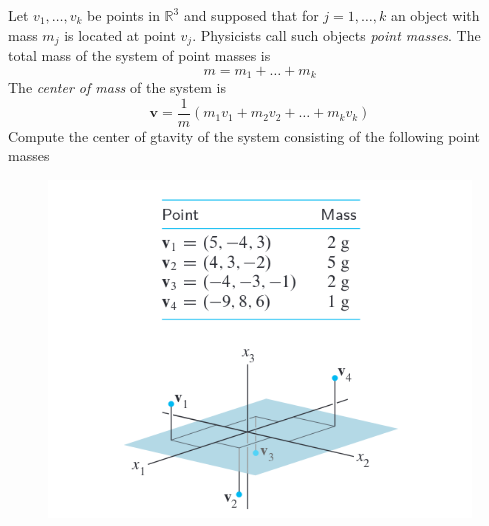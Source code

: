 \documentclass{mathhomework}
\newcommand{\R}{\mathbb{R}}  %
\newcommand{\Vect}[1]{\pmb{#1}}
\begin{document}
\pagebreak
\begin{problem}[1.3\#29]
    Let $v_1,\ldots,v_k$ be points in $\R^3$ and supposed that for $j = 1,\ldots,k$ an object with mass $m_j$ is located at point $v_j$.
    Physicists call such objects \textit{point masses}. The total mass of the system of point masses is
    \begin{equation*}
        m = m_1 + \ldots + m_k
    \end{equation*}
    The \textit{center of mass} of the system is
    \begin{equation*}
        \Vect{v} = \frac{1}{m}(m_1v_1 + m_2v_2 + \ldots + m_kv_k)
    \end{equation*}
    Compute the center of gtavity of the system consisting of the following point masses
    \begin{figure}[H]
        \begin{center}
            \includegraphics[width=5in]{figures/1_3_29.png}
        \end{center}
    \end{figure}


\end{problem}
\end{document}
